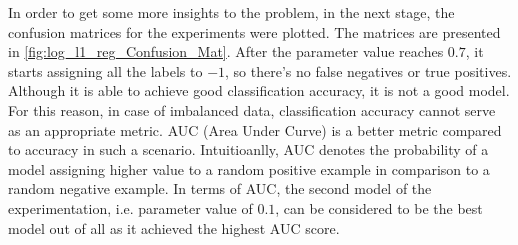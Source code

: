 \documentclass[11pt]{article}
\begin{document}
In order to get some more insights to the problem, in the next stage, the confusion matrices for the experiments were plotted. The matrices are presented in \autoref{fig:log_l1_reg_Confusion_Mat}. After the parameter value reaches $0.7$, it starts assigning all the labels to $-1$, so there's no false negatives or true positives. Although it is able to achieve good classification accuracy, it is not a good model. For this reason, in case of imbalanced data, classification accuracy cannot serve as an appropriate metric. AUC (Area Under Curve) is a better metric compared to accuracy in such a scenario. Intuitioanlly, AUC denotes the probability of a model assigning higher value to a random positive example in comparison to a random negative example. In terms of AUC, the second model of the experimentation, i.e. parameter value of $0.1$, can be considered to be the best model out of all as it achieved the highest AUC score. 
\end{document}
